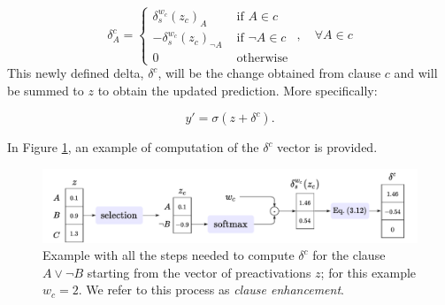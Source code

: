 \begin{equation}
\delta_{A}^{c}= \begin{cases}\delta_{s}^{w_{c}}\left(z_{c}\right)_{A} & \text { if } A \in c \\ -\delta_{s}^{w_{c}}\left(z_{c}\right)_{\neg A} & \text { if } \neg A \in c \\ 0 & \text { otherwise }\end{cases}, \quad \forall A \in c
\label{eq:delta_c}
\end{equation}
This newly defined delta, $\delta^c$, will be the change obtained from clause $c$ and will be summed to $z$ to obtain the updated prediction. More specifically:

$$y' = \sigma(z + \delta^c).$$

In Figure \ref{fig:delta_single_clause}, an example of computation of the $\delta^ c$ vector is provided.

\begin{figure}[h!]
	\centering
	\includegraphics[width=\linewidth]{figures/delta_single_clause.pdf}
	\caption{Example with all the steps needed to compute $\delta^c$ for the clause $A \vee \neg B$ starting from the vector of preactivations $z$; for this example $w_c=2$. We refer to this process as \textit{clause enhancement}.}
	\label{fig:delta_single_clause}
\end{figure}


